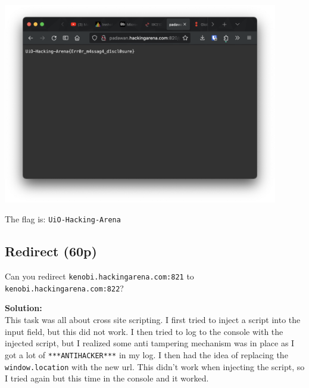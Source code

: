 \begin{center}
    \includegraphics[width=12cm]{img/Web hacking/Web 5/Skjermbilde 2023-10-26 kl. 13.39.25.png}
\end{center}

The flag is: \texttt{UiO-Hacking-Arena}

\newpage
\subsection{Redirect (60p)}
Can you redirect \texttt{kenobi.hackingarena.com:821} to \texttt{kenobi.hackingarena.com:822}?

\textbf{Solution:}\\
This task was all about cross site scripting. I first tried to inject a script into the input field, but this did not work. 
I then tried to log to the console with the injected script, but I realized some anti tampering mechanism was in place as I got a lot of \texttt{***ANTIHACKER***} in my log. 
I then had the idea of replacing the \texttt{window.location} with the new url.
This didn't work when injecting the script, so I tried again but this time in the console and it worked.

